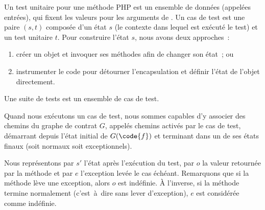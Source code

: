 \begin{definition}

Un {\strong test unitaire} pour une méthode PHP  est un ensemble de
données (appelées entrées), qui fixent les valeurs pour les
arguments de . Un {\strong cas de test} est une paire $(s, t)$ composée
d'un état $s$ (le contexte dans lequel est exécuté le test) et un test unitaire
$t$. Pour construire l'état $s$, nous avons deux approches~:
%
\begin{enumerate}

\item créer un objet et invoquer ses méthodes afin de changer son état~; ou

\item instrumenter le code pour détourner l'encapsulation et définir l'état de
l'objet directement.

\end{enumerate}
%
Une {\strong suite de tests} est un ensemble de cas de test.

\end{definition}

Quand nous exécutons un cas de test, nous sommes capables d'y associer des
chemins du graphe de contrat $G$, appelés chemins {\strong activés par} le cas
de test, démarrant depuis l'état initial de $G(\code{f})$ et terminant dans un
de ses états finaux (soit normaux soit exceptionnels).

Nous représentons par $s'$ l'état après l'exécution du test, par $o$ la valeur
retournée par la méthode  et par $e$ l'exception levée le cas échéant.
Remarquons que si la méthode lève une exception, alors $o$ est indéfinie. À
l'inverse, si la méthode termine normalement (c'est~à~dire sans lever
d'exception), $e$ est considérée comme indéfinie.

